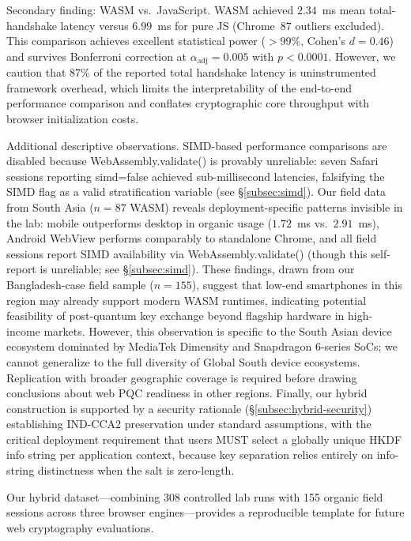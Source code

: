 \documentclass[11pt,a4paper]{article}
\def\textbf#1{#1}%
\def\texttt#1{#1}%
\begin{document}
\textbf{Secondary finding: WASM vs.\ JavaScript.} WASM achieved $2.34$~ms mean total-handshake latency versus $6.99$~ms for pure JS (Chrome~87 outliers excluded). This comparison achieves excellent statistical power ($>99$\%, Cohen's $d = 0.46$) and survives Bonferroni correction at $\alpha_{\text{adj}} = 0.005$ with $p < 0.0001$. However, we caution that 87\% of the reported total handshake latency is uninstrumented framework overhead, which limits the interpretability of the end-to-end performance comparison and conflates cryptographic core throughput with browser initialization costs.

\textbf{Additional descriptive observations.} SIMD-based performance comparisons are disabled because \texttt{WebAssembly.validate()} is provably unreliable: seven Safari sessions reporting \texttt{simd=false} achieved sub-millisecond latencies, falsifying the SIMD flag as a valid stratification variable (see \S\ref{subsec:simd}). Our field data from South Asia ($n=87$ WASM) reveals deployment-specific patterns invisible in the lab: mobile outperforms desktop in organic usage ($1.72$~ms vs.\ $2.91$~ms), Android WebView performs comparably to standalone Chrome, and all field sessions report SIMD availability via \texttt{WebAssembly.validate()} (though this self-report is unreliable; see \S\ref{subsec:simd}). These findings, drawn from our Bangladesh-case field sample ($n=155$), suggest that low-end smartphones in this region may already support modern WASM runtimes, indicating potential feasibility of post-quantum key exchange beyond flagship hardware in high-income markets. However, this observation is specific to the South Asian device ecosystem dominated by MediaTek Dimensity and Snapdragon 6-series SoCs; we cannot generalize to the full diversity of Global South device ecosystems. Replication with broader geographic coverage is required before drawing conclusions about web PQC readiness in other regions. Finally, our hybrid construction is supported by a security rationale (\S\ref{subsec:hybrid-security}) establishing IND-CCA2 preservation under standard assumptions, with the critical deployment requirement that users MUST select a globally unique HKDF info string per application context, because key separation relies entirely on info-string distinctness when the salt is zero-length.

Our hybrid dataset---combining 308 controlled lab runs with 155 organic field sessions across three browser engines---provides a reproducible template for future web cryptography evaluations.
\end{document}
